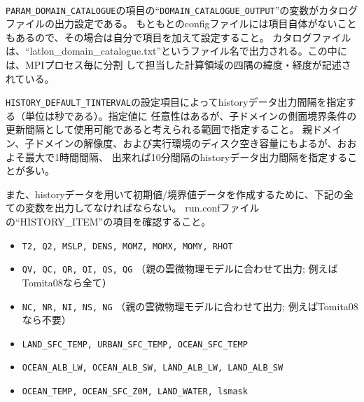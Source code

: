 \\

\verb|PARAM_DOMAIN_CATALOGUE|の項目の``\verb|DOMAIN_CATALOGUE_OUTPUT|''の変数がカタログファイルの出力設定である。
もともとのconfigファイルには項目自体がないこともあるので、その場合は自分で項目を加えて設定すること。
カタログファイルは、``latlon\_domain\_catalogue.txt''というファイル名で出力される。この中には、MPIプロセス毎に分割
して担当した計算領域の四隅の緯度・経度が記述されている。

\verb|HISTORY_DEFAULT_TINTERVAL|の設定項目によってhistoryデータ出力間隔を指定する（単位は秒である）。指定値に
任意性はあるが、子ドメインの側面境界条件の更新間隔として使用可能であると考えられる範囲で指定すること。
親ドメイン、子ドメインの解像度、および実行環境のディスク空き容量にもよるが、おおよそ最大で1時間間隔、
出来れば10分間隔のhistoryデータ出力間隔を指定することが多い。

また、historyデータを用いて初期値/境界値データを作成するために、下記の全ての変数を出力してなければならない。
run.confファイルの``HISTORY\_ITEM''の項目を確認すること。

\begin{itemize}
 \item \verb|T2, Q2, MSLP, DENS, MOMZ, MOMX, MOMY, RHOT|
 \item \verb|QV, QC, QR, QI, QS, QG| {\small （親の雲微物理モデルに合わせて出力; 例えばTomita08なら全て）}
 \item \verb|NC, NR, NI, NS, NG| {\small （親の雲微物理モデルに合わせて出力; 例えばTomita08なら不要）}
 \item \verb|LAND_SFC_TEMP, URBAN_SFC_TEMP, OCEAN_SFC_TEMP|
 \item \verb|OCEAN_ALB_LW, OCEAN_ALB_SW, LAND_ALB_LW, LAND_ALB_SW|
 \item \verb|OCEAN_TEMP, OCEAN_SFC_Z0M, LAND_WATER, lsmask|
\end{itemize}


